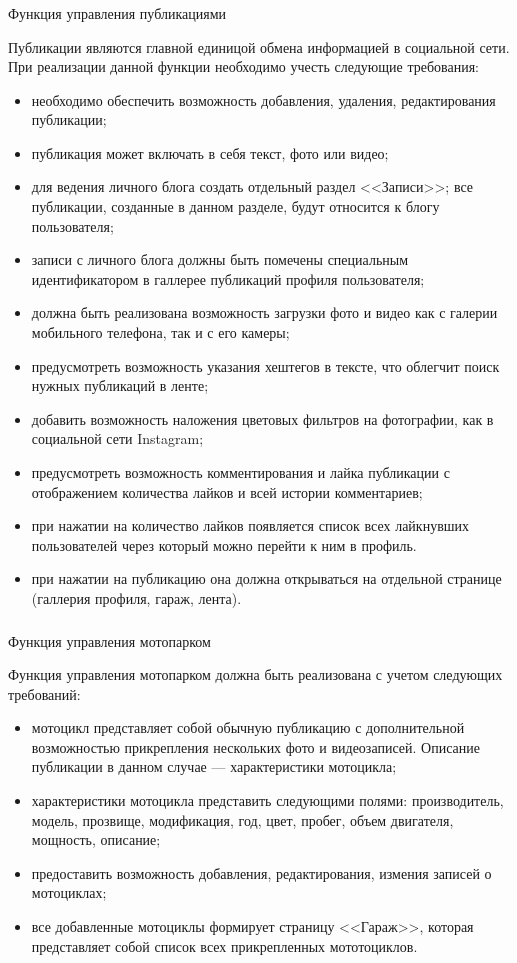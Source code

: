 \subsubsection{} Функция управления публикациями
\label{sec:domain:specification:agenda}

Публикации являются главной единицой обмена информацией в социальной сети. При реализации данной функции необходимо учесть следующие требования:
\begin{itemize}
	\item необходимо обеспечить возможность добавления, удаления, редактирования публикации;
	\item публикация может включать в себя текст, фото или видео;
	\item для ведения личного блога создать отдельный раздел <<Записи>>; все публикации, созданные в данном разделе, будут относится к блогу пользователя;
	\item записи с личного блога должны быть помечены специальным идентификатором в галлерее публикаций профиля пользователя;
	\item должна быть реализована возможность загрузки фото и видео как с галерии мобильного телефона, так и с его камеры;
	\item предусмотреть возможность указания хештегов в тексте, что облегчит поиск нужных публикаций в ленте;
	\item добавить возможность наложения цветовых фильтров на фотографии, как в социальной сети Instagram;
	\item предусмотреть возможность комментирования и лайка публикации с отображением количества лайков и всей истории комментариев;
	\item при нажатии на количество лайков появляется список всех лайкнувших пользователей через который можно перейти к ним в профиль.
	\item при нажатии на публикацию она должна открываться на отдельной странице (галлерия профиля, гараж, лента).
\end{itemize}

\subsubsection{} Функция управления мотопарком
\label{sec:domain:specification:subjects}

Функция управления мотопарком должна быть реализована с учетом следующих требований:
\begin{itemize}
	\item мотоцикл представляет собой обычную публикацию с дополнительной возможностью прикрепления нескольких фото и видеозаписей. Описание публикации в данном случае --- характеристики мотоцикла;
	\item характеристики мотоцикла представить следующими полями: производитель, модель, прозвище, модификация, год, цвет, пробег, объем двигателя, мощность, описание;
	\item предоставить возможность добавления, редактирования, измения записей о мотоциклах;
	\item все добавленные мотоциклы формирует страницу <<Гараж>>, которая представляет собой список всех прикрепленных мототоциклов.
\end{itemize}

